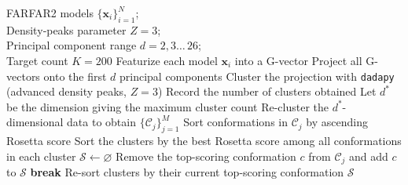\begin{algorithm}[H]
  \caption{Unsupervised selection of diverse candidate conformations}
  \label{ch6:alg:candidate-selection}
  \begin{algorithmic}[1]
    \REQUIRE FARFAR2 models $\{\mathbf{x}_i\}_{i=1}^{N}$; \\
    Density‐peaks parameter $Z{=}3$;\\
    Principal component range $d\!=\!2,3\ldots\,26$;\\
    Target count $K{=}200$
    \STATE Featurize each model $\mathbf{x}_i$ into a G-vector
      \STATE Project all G-vectors onto the first $d$ principal components
      \STATE Cluster the projection with \texttt{dadapy} (advanced density peaks, $Z{=}3$)
      \STATE Record the number of clusters obtained
    \ENDFOR
    \STATE Let $d^\ast$ be the dimension giving the maximum cluster count 
    \STATE Re-cluster the $d^\ast$-dimensional data to obtain $\{\mathcal{C}_j\}_{j=1}^{M}$
      \STATE Sort conformations in $\mathcal{C}_j$ by ascending Rosetta score
    \ENDFOR
    \STATE Sort the clusters by the best Rosetta score among all conformations in each cluster
    \STATE $\mathcal{S} \leftarrow \varnothing$ 
          \STATE Remove the top-scoring conformation $c$ from $\mathcal{C}_j$ and add $c$ to $\mathcal{S}$
            \STATE \textbf{break}
          \ENDIF
        \ENDIF
      \ENDFOR
      \STATE Re-sort clusters by their current top-scoring conformation
    \ENDWHILE
    \RETURN $\mathcal{S}$ 
  \end{algorithmic}
\end{algorithm}

